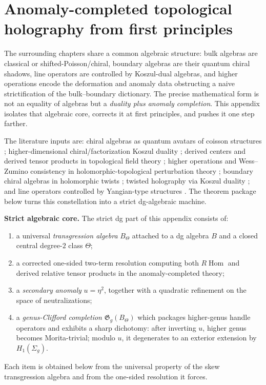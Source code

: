 
\section{Anomaly-completed topological holography from first principles}


The surrounding chapters share a common algebraic structure:
bulk algebras are classical or shifted-Poisson/chiral, boundary algebras are their quantum chiral shadows, line operators are controlled by Koszul-dual algebras, and higher operations encode the deformation and anomaly data obstructing a naive strictification of the bulk--boundary dictionary.
The precise mathematical form is not an equality of algebras but a \emph{duality plus anomaly completion}.
This appendix isolates that algebraic core, corrects it at first principles, and pushes it one step farther.

The literature inputs are:
chiral algebras as quantum avatars of coisson structures \cite{BD04};
higher-dimensional chiral/factorization Koszul duality \cite{FG12};
derived centers and derived tensor products in topological field theory \cite{costello-gaiotto,CP2020,DNP25};
higher operations and Wess--Zumino consistency in holomorphic-topological perturbation theory \cite{GKW24};
boundary chiral algebras in holomorphic twists \cite{CDG20};
twisted holography via Koszul duality \cite{Zeng23};
and line operators controlled by Yangian-type structures \cite{DNP25}.
The theorem package below turns this constellation into a strict dg-algebraic machine.

\medskip

\noindent\textbf{Strict algebraic core.}
The strict dg part of this appendix consists of:
\begin{enumerate}
\item a universal \emph{transgression algebra} \(B_{\Theta}\) attached to a dg algebra \(B\) and a closed central degree-\(2\) class \(\Theta\);
\item a corrected one-sided two-term resolution computing both \(R\!\operatorname{Hom}\) and derived relative tensor products in the anomaly-completed theory;
\item a \emph{secondary anomaly} \(u=\eta^{2}\), together with a quadratic refinement on the space of neutralizations;
\item a \emph{genus-Clifford completion} \(\mathfrak{G}_{g}(B_{\Theta})\) which packages higher-genus handle operators and exhibits a sharp dichotomy:
after inverting \(u\), higher genus becomes Morita-trivial; modulo \(u\), it degenerates to an exterior extension by \(H_{1}(\Sigma_{g})\).
\end{enumerate}
Each item is obtained below from the universal property of the skew
transgression algebra and from the one-sided resolution it forces.

